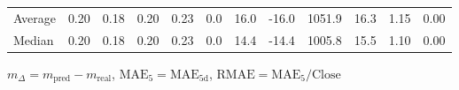 \begin{threeparttable}
{\begin{tabular}{lrrrrrrrrrrr}
Average &          0.20 &          0.18 &          0.20 &        0.23 &                 0.0 &                16.0 &      -16.0 &              1051.9 &             16.3 &            1.15 &                   0.00 \\
 Median &          0.20 &          0.18 &          0.20 &        0.23 &                 0.0 &                14.4 &      -14.4 &              1005.8 &             15.5 &            1.10 &                   0.00 \\
\bottomrule
\end{tabular}
}
\begin{tablenotes}\footnotesize
\item $m_\Delta=m_{\text{pred}}-m_{\text{real}}$,
$\mathrm{MAE}_5=\mathrm{MAE}_{5\text{d}}$,
$\mathrm{RMAE}=\mathrm{MAE}_5/\text{Close}$
\end{tablenotes}
\end{threeparttable}
\endgroup


